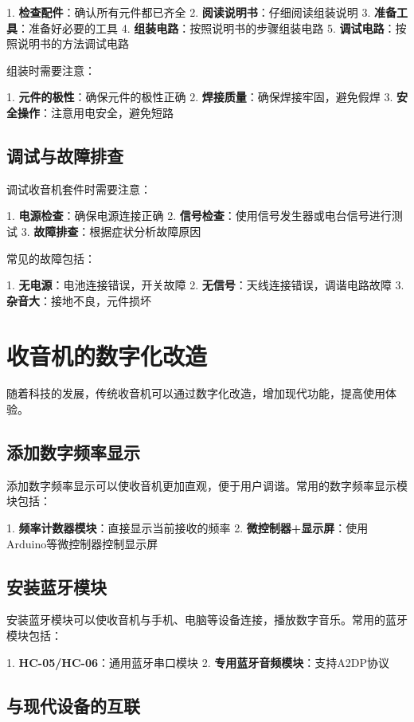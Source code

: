 \documentclass[12pt,UTF8]{ctexbook}
\begin{document}
1. \textbf{检查配件}：确认所有元件都已齐全
2. \textbf{阅读说明书}：仔细阅读组装说明
3. \textbf{准备工具}：准备好必要的工具
4. \textbf{组装电路}：按照说明书的步骤组装电路
5. \textbf{调试电路}：按照说明书的方法调试电路

组装时需要注意：

1. \textbf{元件的极性}：确保元件的极性正确
2. \textbf{焊接质量}：确保焊接牢固，避免假焊
3. \textbf{安全操作}：注意用电安全，避免短路

\section{调试与故障排查}

调试收音机套件时需要注意：

1. \textbf{电源检查}：确保电源连接正确
2. \textbf{信号检查}：使用信号发生器或电台信号进行测试
3. \textbf{故障排查}：根据症状分析故障原因

常见的故障包括：

1. \textbf{无电源}：电池连接错误，开关故障
2. \textbf{无信号}：天线连接错误，调谐电路故障
3. \textbf{杂音大}：接地不良，元件损坏

\chapter{收音机的数字化改造}

随着科技的发展，传统收音机可以通过数字化改造，增加现代功能，提高使用体验。

\section{添加数字频率显示}

添加数字频率显示可以使收音机更加直观，便于用户调谐。常用的数字频率显示模块包括：

1. \textbf{频率计数器模块}：直接显示当前接收的频率
2. \textbf{微控制器+显示屏}：使用Arduino等微控制器控制显示屏

\section{安装蓝牙模块}

安装蓝牙模块可以使收音机与手机、电脑等设备连接，播放数字音乐。常用的蓝牙模块包括：

1. \textbf{HC-05/HC-06}：通用蓝牙串口模块
2. \textbf{专用蓝牙音频模块}：支持A2DP协议

\section{与现代设备的互联}
\end{document}
